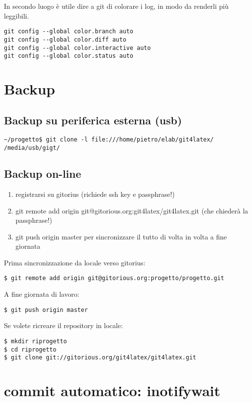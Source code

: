 \documentclass[a4paper,12pt,oneside]{article}
\begin{document}
In secondo luogo è utile dire a git di colorare i log, in modo da renderli più
leggibili.
\begin{lstlisting}
git config --global color.branch auto
git config --global color.diff auto
git config --global color.interactive auto
git config --global color.status auto
\end{lstlisting}

\section{Backup}
\subsection{Backup su periferica esterna (usb)}
\begin{lstlisting}
~/progetto$ git clone -l file:///home/pietro/elab/git4latex/ /media/usb/gigt/
\end{lstlisting}

\subsection{Backup on-line}

\begin{enumerate}
\item registrarsi su gitorius (richiede ssh key e passphrase!)
\item git remote add origin git@gitorious.org:git4latex/git4latex.git
(che chiederà la passphrase!)
\item git push origin master
per sincronizzare il tutto di volta in volta a fine giornata
\end{enumerate}

Prima sincronizzazione da locale verso gitorius:
\begin{lstlisting}
$ git remote add origin git@gitorious.org:progetto/progetto.git
\end{lstlisting}

A fine giornata di lavoro:
\begin{lstlisting}
$ git push origin master
\end{lstlisting}

Se volete ricreare il repository in locale:
\begin{lstlisting}
$ mkdir riprogetto
$ cd riprogetto
$ git clone git://gitorious.org/git4latex/git4latex.git
\end{lstlisting}

\section{commit automatico: inotifywait}
\end{document}
